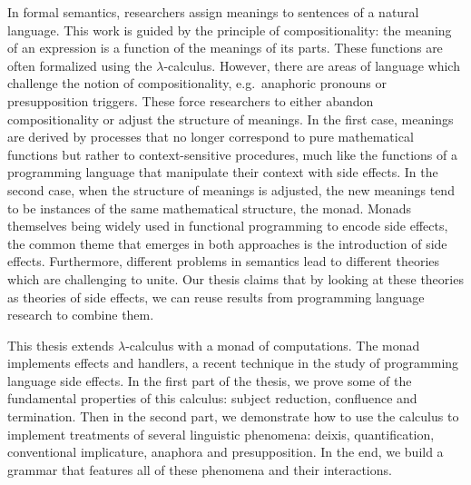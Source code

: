 \begin{ThesisAbstract}
\begin{FrenchAbstract}
\begin{french}
    \end{french}
  \end{FrenchAbstract}

  \begin{EnglishAbstract}
    In formal semantics, researchers assign meanings to sentences of a
    natural language. This work is guided by the principle of
    compositionality: the meaning of an expression is a function of the
    meanings of its parts. These functions are often formalized using the
    $\lambda$-calculus. However, there are areas of language which
    challenge the notion of compositionality, e.g.\ anaphoric pronouns or
    presupposition triggers. These force researchers to either abandon
    compositionality or adjust the structure of meanings.  In the first
    case, meanings are derived by processes that no longer correspond to
    pure mathematical functions but rather to context-sensitive procedures,
    much like the functions of a programming language that manipulate their
    context with side effects. In the second case, when the structure of
    meanings is adjusted, the new meanings tend to be instances of the same
    mathematical structure, the monad. Monads themselves being widely used
    in functional programming to encode side effects, the common theme that
    emerges in both approaches is the introduction of side
    effects. Furthermore, different problems in semantics lead to different
    theories which are challenging to unite. Our thesis claims that by
    looking at these theories as theories of side effects, we can reuse
    results from programming language research to combine them.

    This thesis extends $\lambda$-calculus with a monad of computations. The
    monad implements effects and handlers, a recent technique in the study
    of programming language side effects.  In the first part of the thesis,
    we prove some of the fundamental properties of this calculus: subject
    reduction, confluence and termination. Then in the second part, we
    demonstrate how to use the calculus to implement treatments of several
    linguistic phenomena: deixis, quantification, conventional implicature,
    anaphora and presupposition. In the end, we build a grammar that
    features all of these phenomena and their interactions.

  \end{EnglishAbstract}
\end{ThesisAbstract}
